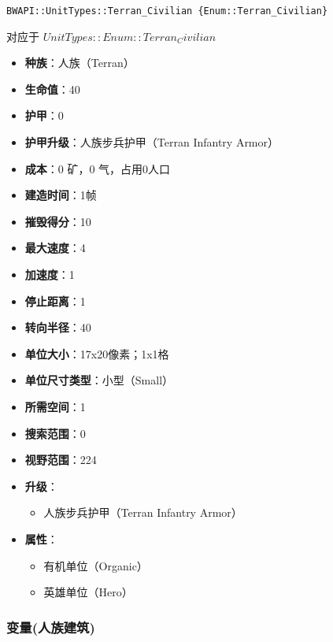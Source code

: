 \begin{tcolorbox}[colback=white, colframe=black!60!white, title=Terran\_Civilian(), arc=0mm]
    \begin{verbatim}
BWAPI::UnitTypes::Terran_Civilian {Enum::Terran_Civilian}
    \end{verbatim}
    对应于  $ UnitTypes::Enum::Terran_Civilian $ 
    \begin{itemize}
        \item \textbf{种族}：人族（Terran）
        \item \textbf{生命值}：40
        \item \textbf{护甲}：0
        \item \textbf{护甲升级}：人族步兵护甲（Terran Infantry Armor）
        \item \textbf{成本}：0 矿，0 气，占用0人口
        \item \textbf{建造时间}：1帧
        \item \textbf{摧毁得分}：10
        \item \textbf{最大速度}：4
        \item \textbf{加速度}：1
        \item \textbf{停止距离}：1
        \item \textbf{转向半径}：40
        \item \textbf{单位大小}：17x20像素；1x1格
        \item \textbf{单位尺寸类型}：小型（Small）
        \item \textbf{所需空间}：1
        \item \textbf{搜索范围}：0
        \item \textbf{视野范围}：224
        \item \textbf{升级}：
            \begin{itemize}
                \item 人族步兵护甲（Terran Infantry Armor）
            \end{itemize}
        \item \textbf{属性}：
            \begin{itemize}
                \item 有机单位（Organic）
                \item 英雄单位（Hero）
            \end{itemize}
    \end{itemize}
    
\end{tcolorbox}

\subsubsection{变量(人族建筑)}

